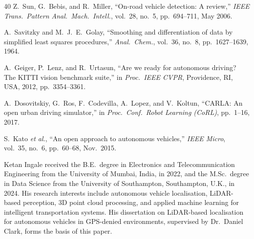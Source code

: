 \documentclass[lettersize,journal]{IEEEtran}
\begin{document}
\begin{thebibliography}{40}
Z.~Sun, G.~Bebis, and R.~Miller,
``On-road vehicle detection: A review,''
\textit{IEEE Trans.\ Pattern Anal.\ Mach.\ Intell.}, vol.~28, no.~5,
pp.~694--711, May 2006.

A.~Savitzky and M.~J.~E.~Golay,
``Smoothing and differentiation of data by simplified least squares
procedures,''
\textit{Anal.\ Chem.}, vol.~36, no.~8, pp.~1627--1639, 1964.

A.~Geiger, P.~Lenz, and R.~Urtasun,
``Are we ready for autonomous driving? The {KITTI} vision benchmark
suite,''
in \textit{Proc.\ IEEE CVPR}, Providence, RI, USA, 2012, pp.~3354--3361.

A.~Dosovitskiy, G.~Ros, F.~Codevilla, A.~Lopez, and V.~Koltun,
``{CARLA}: An open urban driving simulator,''
in \textit{Proc.\ Conf.\ Robot Learning (CoRL)}, pp.~1--16, 2017.

S.~Kato \textit{et al.},
``An open approach to autonomous vehicles,''
\textit{IEEE Micro}, vol.~35, no.~6, pp.~60--68, Nov.\ 2015.

\end{thebibliography}

\newpage

\begin{IEEEbiographynophoto}{Ketan Ingale}
received the B.E.\ degree in Electronics and Telecommunication Engineering
from the University of Mumbai, India, in 2022, and the M.Sc.\ degree in
Data Science from the University of Southampton, Southampton, U.K., in 2024.
His research interests include autonomous vehicle localisation, LiDAR-based
perception, 3D point cloud processing, and applied machine learning for
intelligent transportation systems. His dissertation on LiDAR-based
localisation for autonomous vehicles in GPS-denied environments, supervised
by Dr.\ Daniel Clark, forms the basis of this paper.
\end{IEEEbiographynophoto}
\end{document}
